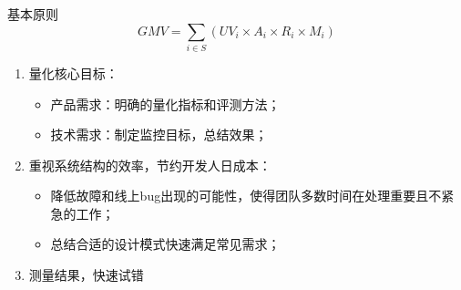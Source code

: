 \documentclass{beamer}
\begin{document}
\begin{CJK}{UTF8}{gbsn}
\begin{frame}{基本原则}
  $$ GMV = \sum_{i \in S}{(UV_i \times A_i \times R_i \times M_i)} $$
  \begin{enumerate}
  \item {
    量化核心目标：
    \begin{itemize}
    \item<2-> { 产品需求：明确的量化指标和评测方法； }
    \item<2-> { 技术需求：制定监控目标，总结效果； }
    \end{itemize}
  }
  \item {
    重视系统结构的效率，节约开发人日成本：
    \begin{itemize}
    \item<3-> { 降低故障和线上bug出现的可能性，使得团队多数时间在处理重要且不紧急的工作； }
    \item<3-> { 总结合适的设计模式快速满足常见需求； }
    \end{itemize}
  }
  \item {
    测量结果，快速试错
  }
  \end{enumerate}
\end{frame}


\end{CJK}
\end{document}
